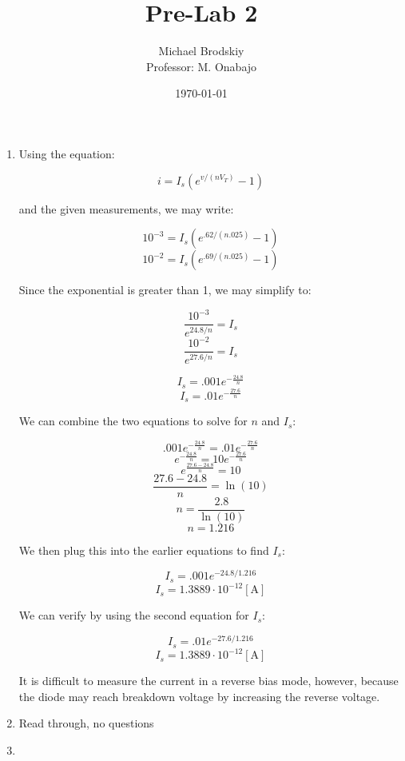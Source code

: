 


\title{Pre-Lab 2}
\date{\today}
\author{Michael Brodskiy\\ \small Professor: M. Onabajo}



\maketitle

\begin{enumerate}

  \item

    Using the equation:

    $$i=I_s\left( e^{v/(nV_T)}-1 \right)$$

    and the given measurements, we may write:

    $$10^{-3}=I_s\left( e^{.62/(n.025)}-1 \right)$$
    $$10^{-2}=I_s\left( e^{.69/(n.025)}-1 \right)$$

    Since the exponential is greater than 1, we may simplify to:

    $$\frac{10^{-3}}{e^{24.8/n}}=I_s$$
    $$\frac{10^{-2}}{e^{27.6/n}}=I_s$$

    $$I_s=.001e^{-\frac{24.8}{n}}$$
    $$I_s=.01e^{-\frac{27.6}{n}}$$

    We can combine the two equations to solve for $n$ and $I_s$:

    $$.001e^{-\frac{24.8}{n}}=.01e^{-\frac{27.6}{n}}$$
    $$e^{-\frac{24.8}{n}}=10e^{-\frac{27.6}{n}}$$
    $$e^{\frac{27.6-24.8}{n}}=10$$
    $$\frac{27.6-24.8}{n}=\ln(10)$$
    $$n=\frac{2.8}{\ln(10)}$$
    $$\boxed{n=1.216}$$

    We then plug this into the earlier equations to find $I_s$:

    $$I_s=.001e^{-24.8/1.216}$$
    $$\boxed{I_s=1.3889\cdot10^{-12}[\si{\ampere}]}$$

    We can verify by using the second equation for $I_s$:

    $$I_s=.01e^{-27.6/1.216}$$
    $$\boxed{I_s=1.3889\cdot10^{-12}[\si{\ampere}]}$$

    It is difficult to measure the current in a reverse bias mode, however, because the diode may reach breakdown voltage by increasing the reverse voltage.

  \item Read through, no questions \textcolor{green}{\checkmark}

  \item

\end{enumerate}



